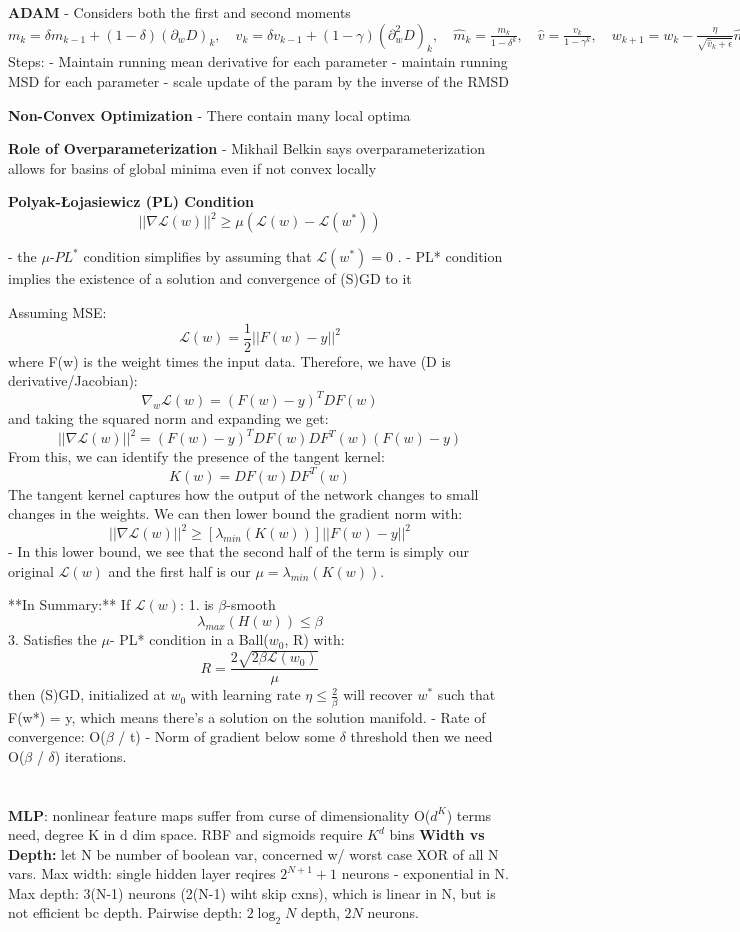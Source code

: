 \textbf{ADAM} 
- Considers both the first and second moments
$
m_{k}= \delta m_{k-1} + (1-\delta)(\partial_{w}D)_{k}, \quad v_{k}= \delta v_{k-1}+ (1-\gamma )(\partial_{w}^{2}D)_{k}, \quad \hat m_{k}= \frac{m_{k}}{1-\delta^{k}}, \quad \hat v = \frac{v_{k}}{1-\gamma^{k}}, \quad w_{k+1}= w_{k}- \frac{\eta}{\sqrt{\hat v_{k}+ \epsilon }}\hat m_{k}
$
Steps: 
- Maintain running mean derivative for each parameter
- maintain running MSD for each parameter
- scale update of the param by the inverse of the RMSD 


\textbf{Non-Convex Optimization} 
- There contain many local optima 

\textbf{Role of Overparameterization}
- Mikhail Belkin says overparameterization allows for basins of global minima even if not convex locally

\textbf{Polyak-Łojasiewicz (PL) Condition}
$$||\nabla \mathcal{L}(w) ||^{2} \geq \mu(\mathcal L(w) - \mathcal L(w^{*}))$$

- the $\mu$-$PL^{*}$ condition simplifies by assuming that $\mathcal L(w^{*})= 0$ . 
- PL* condition implies the existence of a solution and convergence of (S)GD to it

Assuming MSE: 
$$\mathcal L(w) = \frac{1}{2} ||F(w)-y||^{2}$$ where F(w) is the weight times the input data. Therefore, we have (D is derivative/Jacobian): 
$$\nabla_{w}\mathcal L(w) = (F(w)-y)^{T}DF(w)$$
and taking the squared norm and expanding we get: 
$$||\nabla \mathcal L(w)||^{2}=(F(w) -y)^{T}DF(w)DF^{T}(w)(F(w) -y)$$
From this, we can identify the presence of the tangent kernel:
$$K(w) = DF(w)DF^{T}(w)$$The tangent kernel captures how the output of the network changes to small changes in the weights. We can then lower bound the gradient norm with: 
$$||\nabla \mathcal L(w)||^{2} \geq \left[\lambda_{min}(K(w))\right]||F(w)-y||^{2}$$
- In this lower bound, we see that the second half of the term is simply our original $\mathcal L(w)$ and the first half is our $\mu = \lambda_{min}(K(w))$. 

**In Summary:**
If $\mathcal L(w)$: 
1. is $\beta$-smooth
$$\lambda_{max}(H(w)) \leq \beta$$
3. Satisfies the $\mu$- PL* condition in a Ball($w_{0}$, R) with: 
$$R = \frac{2\sqrt{2\beta \mathcal L(w_0)}}{\mu}$$
then (S)GD, initialized at $w_0$ with learning rate $\eta \leq \frac{2}{\beta}$ will recover $w^{*}$ such that F(w*) = y, which means there's a solution on the solution manifold. 
- Rate of convergence: O($\beta$ / t)
- Norm of gradient below some $\delta$ threshold then we need O($\beta$ / $\delta$) iterations. 
 \\
 \\
 \\
\textbf{MLP}: nonlinear feature maps suffer from curse of dimensionality O($d^K$) terms need, degree K in d dim space. 
RBF and sigmoids require $K^d$ bins
\textbf{Width vs Depth:} let N be number of boolean var, concerned w/ worst case XOR of all N vars. 
Max width: single hidden layer reqires $2^{N+1} + 1$ neurons - exponential in N. 
Max depth: 3(N-1) neurons (2(N-1) wiht skip cxns), which is linear in N, but is not efficient bc depth. 
Pairwise depth: $2\log_{2}N$ depth, $2N$ neurons.


